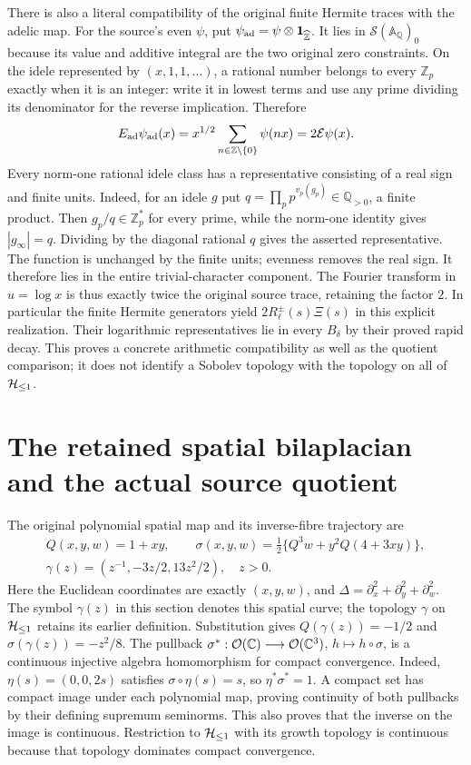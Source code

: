 There is also a literal compatibility of the original finite Hermite
traces with the adelic map. For the source's even $\psi$, put
$\psi_{\rm ad}=\psi\otimes\mathbf1_{\widehat{\mathbb Z}}$.
It lies in $\mathcal S(\mathbb A_{\mathbb Q})_0$ because its value
and additive integral are the two original zero constraints.
On the idele represented by $(x,1,1,\ldots)$, a rational number
belongs to every $\mathbb Z_p$ exactly when it is an integer:
write it in lowest terms and use any prime dividing its denominator
for the reverse implication. Therefore
\[
 E_{\rm ad}\psi_{\rm ad}(x)
   =x^{1/2}\sum_{n\in\mathbb Z\setminus\{0\}}\psi(nx)
   =2\mathcal E\psi(x).
\]
Every norm-one rational idele class has a representative consisting
of a real sign and finite units. Indeed, for an idele $g$ put
$q=\prod_p p^{v_p(g_p)}\in\mathbb Q_{>0}$, a finite product.
Then $g_p/q\in\mathbb Z_p^*$ for every prime, while the
norm-one identity gives $|g_\infty|=q$. Dividing by the diagonal
rational $q$ gives the asserted representative. The function
is unchanged by the finite units; evenness removes the real sign.
It therefore lies in the entire trivial-character component.
The Fourier transform in $u=\log x$ is thus exactly twice the
original source trace, retaining the factor $2$. In particular the
finite Hermite generators yield $2R_\ell^\pm(s)\Xi(s)$ in this
explicit realization. Their logarithmic representatives lie in
every $B_\delta$ by their proved rapid decay. This proves a concrete
arithmetic compatibility as well as the quotient comparison; it
does not identify a Sobolev topology with the topology on all of
$\mathcal H_{\leq 1}$.

\section{The retained spatial bilaplacian and the actual source quotient}
\label{sec:cq-bilaplacian-source}

The original polynomial spatial map and its inverse-fibre trajectory are
\begin{gather*}
 Q(x,y,w)=1+xy,\qquad
 \sigma(x,y,w)=\tfrac12\{Q^3w+y^2Q(4+3xy)\},\\
 \gamma(z)=(z^{-1},-3z/2,13z^2/2),\quad z>0.
\end{gather*}
Here the Euclidean coordinates are exactly $(x,y,w)$, and
$\Delta=\partial_x^2+\partial_y^2+\partial_w^2$.
The symbol $\gamma(z)$ in this section denotes this spatial curve;
the topology $\gamma$ on $\mathcal H_{\leq 1}$ retains its earlier definition.
Substitution gives $Q(\gamma(z))=-1/2$ and
$\sigma(\gamma(z))=-z^2/8$.
The pullback
$\sigma^*:\mathcal O(\mathbb C)\longrightarrow\mathcal O(\mathbb C^3)$,
$h\longmapsto h\circ\sigma$, is a continuous injective algebra
homomorphism for compact convergence. Indeed,
$\eta(s)=(0,0,2s)$ satisfies $\sigma\circ\eta(s)=s$,
so $\eta^*\sigma^*=1$. A compact set has compact image under each
polynomial map, proving continuity of both pullbacks by their
defining supremum seminorms. This also proves that the inverse on
the image is continuous. Restriction to $\mathcal H_{\leq 1}$ with its growth
topology is continuous because that topology dominates compact
convergence.

